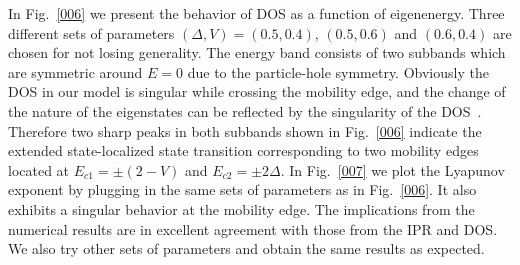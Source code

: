 \documentclass[prb,showpacs,twocolumn,aps,superscriptaddress,a4paper]{revtex4-1}
\begin{document}
In Fig.~\ref{006} we present the behavior of DOS as a function of eigenenergy. Three different sets of parameters $(\Delta,V)=(0.5,0.4)$, $(0.5,0.6)$ and $(0.6,0.4)$ are chosen for not losing generality. The energy band consists of two subbands which are symmetric around $E=0$ due to the particle-hole symmetry. Obviously the DOS in our model is singular while crossing the mobility edge, and the change of the nature of the eigenstates can be reflected by the singularity of the DOS~\cite{thou17,sarma18}. Therefore two sharp peaks in both subbands shown in Fig.~\ref{006} indicate the extended state-localized state transition corresponding to two mobility edges located at $E_{c1}=\pm (2- V)$ and $E_{c2}=\pm 2\Delta$. In Fig.~\ref{007} we plot the Lyapunov exponent by plugging in the same sets of parameters as in Fig.~\ref{006}. It also exhibits a singular behavior at the mobility edge. The implications from the numerical results are in excellent agreement with those from the IPR and DOS. We also try other sets of parameters and obtain the same results as expected.
\end{document}
